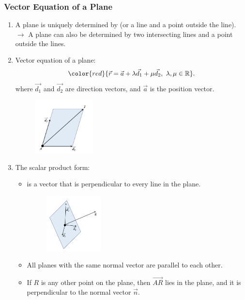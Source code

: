 \documentclass[12pt, a4paper]{article}
\begin{document}
\subsubsection{Vector Equation of a Plane}
\begin{enumerate}
  \item A plane is uniquely determined by {\color{red}{three points}} (or a line and a point outside the line).\\
  $\rightarrow$ A plane can also be determined by two intersecting lines and a point outside the lines. 
  \item Vector equation of a plane: 
  $${\color{red}{\vec{r}=\vec{a}+\lambda\vec{d_1}+\mu\vec{d_2},\ \lambda,\mu\in\mathbb{R}}}.$$
  where $\vec{d_1}$ and $\vec{d_2}$ are direction vectors, and $\vec{a}$ is the position vector. 
  \begin{figure}[H]
    \centering
    \includegraphics[width=0.3\textwidth]{Fig.3.12.jpg}
  \end{figure}
  \item The scalar product form: 
  \begin{itemize}
    \item \textbf{\color{red}{Normal vector}} is a vector that is perpendicular to every line in the plane. 
    \begin{figure}[H]
      \centering
      \includegraphics[width=0.3\textwidth]{Fig.3.13.jpg}
    \end{figure}
    \item All planes with the same normal vector are parallel to each other. 
    \item If $R$ is any other point on the plane, then $\overrightarrow{AR}$ lies in the plane, and it is perpendicular to the normal vector $\vec{n}$.

\end{itemize}
\end{enumerate}
\end{document}
